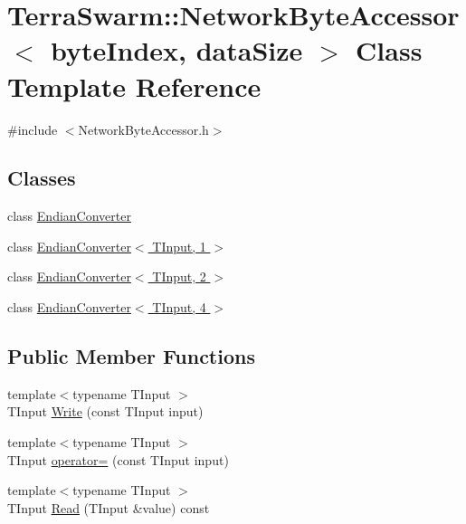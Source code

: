 \hypertarget{class_terra_swarm_1_1_network_byte_accessor}{\section{Terra\-Swarm\-:\-:Network\-Byte\-Accessor$<$ byte\-Index, data\-Size $>$ Class Template Reference}
\label{class_terra_swarm_1_1_network_byte_accessor}
}


{\ttfamily \#include $<$Network\-Byte\-Accessor.\-h$>$}

\subsection*{Classes}
\begin{DoxyCompactItemize}
\item 
class \hyperlink{class_terra_swarm_1_1_network_byte_accessor_1_1_endian_converter}{Endian\-Converter}
\item 
class \hyperlink{class_terra_swarm_1_1_network_byte_accessor_1_1_endian_converter_3_01_t_input_00_011_01_4}{Endian\-Converter$<$ T\-Input, 1 $>$}
\item 
class \hyperlink{class_terra_swarm_1_1_network_byte_accessor_1_1_endian_converter_3_01_t_input_00_012_01_4}{Endian\-Converter$<$ T\-Input, 2 $>$}
\item 
class \hyperlink{class_terra_swarm_1_1_network_byte_accessor_1_1_endian_converter_3_01_t_input_00_014_01_4}{Endian\-Converter$<$ T\-Input, 4 $>$}
\end{DoxyCompactItemize}
\subsection*{Public Member Functions}
\begin{DoxyCompactItemize}
\item 
{\footnotesize template$<$typename T\-Input $>$ }\\T\-Input \hyperlink{class_terra_swarm_1_1_network_byte_accessor_a7d6e11dd4a5f86e6c036bbcf64bccf25}{Write} (const T\-Input input)
\item 
{\footnotesize template$<$typename T\-Input $>$ }\\T\-Input \hyperlink{class_terra_swarm_1_1_network_byte_accessor_a860d2c70eadf18eccbcf1488f1a0e5d5}{operator=} (const T\-Input input)
\item 
{\footnotesize template$<$typename T\-Input $>$ }\\T\-Input \hyperlink{class_terra_swarm_1_1_network_byte_accessor_a30b72470a765a59f572cc72db86db29a}{Read} (T\-Input \&value) const 
\end{DoxyCompactItemize}


